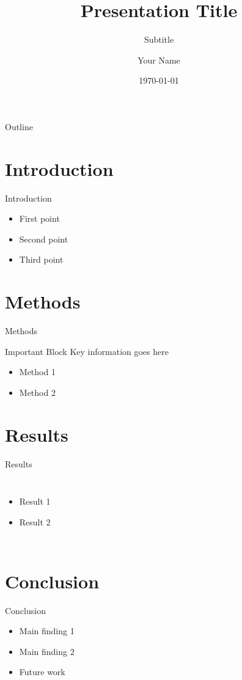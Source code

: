 \documentclass[aspectratio=169]{beamer}  %
\title{Presentation Title}
\subtitle{Subtitle}
\author{Your Name}
\institute{Hong Kong University of Science and Technology}
\date{\today}
\begin{document}
\begin{frame}
    \titlepage
\end{frame}

\begin{frame}{Outline}
    \tableofcontents
\end{frame}

\section{Introduction}
\begin{frame}{Introduction}
    \begin{itemize}
        \item First point
        \item Second point
        \item Third point
    \end{itemize}
\end{frame}

\section{Methods}
\begin{frame}{Methods}
    \begin{block}{Important Block}
        Key information goes here
    \end{block}
    
    \begin{itemize}
        \item Method 1
        \item Method 2
    \end{itemize}
\end{frame}

\section{Results}
\begin{frame}{Results}
    \begin{columns}
        \begin{itemize}
            \item Result 1
            \item Result 2
        \end{itemize}
        
    \end{columns}
\end{frame}

\section{Conclusion}
\begin{frame}{Conclusion}
    \begin{itemize}
        \item Main finding 1
        \item Main finding 2
        \item Future work
    \end{itemize}
\end{frame}
\end{document}
